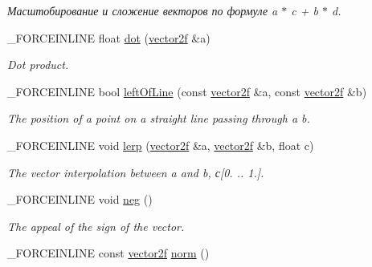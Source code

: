 \begin{DoxyCompactItemize}
\begin{DoxyCompactList}\small\item\em Масштобирование и сложение векторов по формуле a $\ast$ c + b $\ast$ d. \end{DoxyCompactList}\item 
\hypertarget{classbt_1_1vector2f_a65b28ba801e0ddeb5947e946a0f01fcb}{\-\_\-\-F\-O\-R\-C\-E\-I\-N\-L\-I\-N\-E float \hyperlink{classbt_1_1vector2f_a65b28ba801e0ddeb5947e946a0f01fcb}{dot} (\hyperlink{classbt_1_1vector2f}{vector2f} \&a)}\label{classbt_1_1vector2f_a65b28ba801e0ddeb5947e946a0f01fcb}

\begin{DoxyCompactList}\small\item\em Dot product. \end{DoxyCompactList}\item 
\hypertarget{classbt_1_1vector2f_a0156c716584adb65a237fd9c2761cecd}{\-\_\-\-F\-O\-R\-C\-E\-I\-N\-L\-I\-N\-E bool \hyperlink{classbt_1_1vector2f_a0156c716584adb65a237fd9c2761cecd}{left\-Of\-Line} (const \hyperlink{classbt_1_1vector2f}{vector2f} \&a, const \hyperlink{classbt_1_1vector2f}{vector2f} \&b)}\label{classbt_1_1vector2f_a0156c716584adb65a237fd9c2761cecd}

\begin{DoxyCompactList}\small\item\em The position of a point on a straight line passing through a b. \end{DoxyCompactList}\item 
\hypertarget{classbt_1_1vector2f_a4330ddd9520f8bdf6c1e3da58a39ab48}{\-\_\-\-F\-O\-R\-C\-E\-I\-N\-L\-I\-N\-E void \hyperlink{classbt_1_1vector2f_a4330ddd9520f8bdf6c1e3da58a39ab48}{lerp} (\hyperlink{classbt_1_1vector2f}{vector2f} \&a, \hyperlink{classbt_1_1vector2f}{vector2f} \&b, float c)}\label{classbt_1_1vector2f_a4330ddd9520f8bdf6c1e3da58a39ab48}

\begin{DoxyCompactList}\small\item\em The vector interpolation between a and b, с\mbox{[}0. .. 1.\mbox{]}. \end{DoxyCompactList}\item 
\hypertarget{classbt_1_1vector2f_a7f40f46e7fa849300ef3ce71810f7671}{\-\_\-\-F\-O\-R\-C\-E\-I\-N\-L\-I\-N\-E void \hyperlink{classbt_1_1vector2f_a7f40f46e7fa849300ef3ce71810f7671}{neg} ()}\label{classbt_1_1vector2f_a7f40f46e7fa849300ef3ce71810f7671}

\begin{DoxyCompactList}\small\item\em The appeal of the sign of the vector. \end{DoxyCompactList}\item 
\hypertarget{classbt_1_1vector2f_a34108a2d09322b58726a5251dae3af2f}{\-\_\-\-F\-O\-R\-C\-E\-I\-N\-L\-I\-N\-E const \hyperlink{classbt_1_1vector2f}{vector2f} \hyperlink{classbt_1_1vector2f_a34108a2d09322b58726a5251dae3af2f}{norm} ()}\label{classbt_1_1vector2f_a34108a2d09322b58726a5251dae3af2f}


\end{DoxyCompactItemize}
